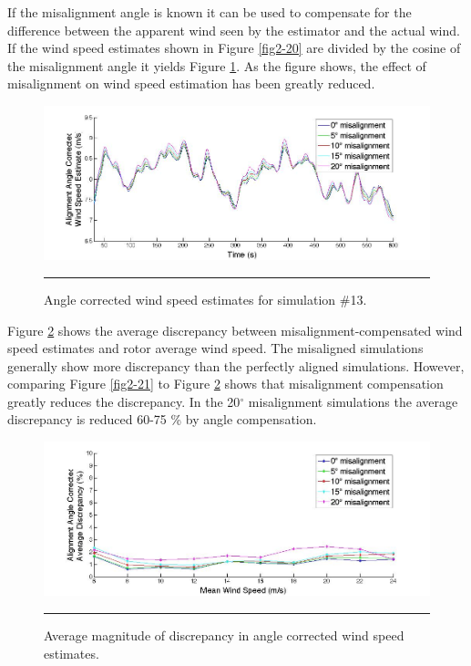 If the misalignment angle is known it can be used to compensate for the difference between the apparent wind seen by the estimator and the actual wind. If the wind speed estimates shown in Figure \ref{fig2-20} are divided by the cosine of the misalignment angle it yields Figure \ref{fig2-23}. As the figure shows, the effect of misalignment on wind speed estimation has been greatly reduced. 


\begin{figure}[htbp]
	\centering
		\includegraphics[trim = {3cm 0 2.5cm 0}, clip, width = \linewidth]{Figures/ch2Figures/fig2-23.jpg}
		\rule{35em}{0.5pt}
	\caption{Angle corrected wind speed estimates for simulation \#13.}
	\label{fig2-23}
\end{figure}


Figure \ref{fig2-24} shows the average discrepancy between misalignment-compensated wind speed estimates and rotor average wind speed. The misaligned simulations generally show more discrepancy than the perfectly aligned simulations. However, comparing Figure \ref{fig2-21} to Figure \ref{fig2-24} shows that misalignment compensation greatly reduces the discrepancy. In the 20$^\circ$ misalignment simulations the average discrepancy is reduced 60-75 \% by angle compensation.


\begin{figure}[htbp]
	\centering
		\includegraphics[trim = {3cm 0 2.5cm 0}, clip, width = \linewidth]{Figures/ch2Figures/fig2-24.jpg}
		\rule{35em}{0.5pt}
	\caption{Average magnitude of discrepancy in angle corrected wind speed estimates.}
	\label{fig2-24}
\end{figure}


